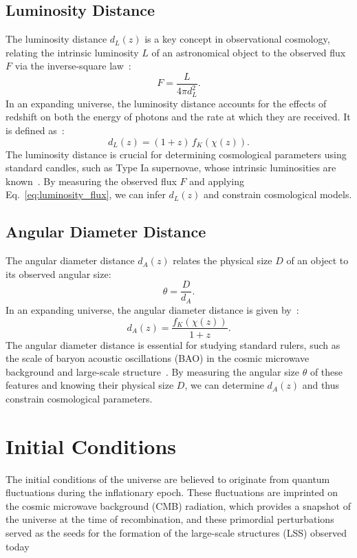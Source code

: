 \subsection{Luminosity Distance}
The luminosity distance \( d_L(z) \) is a key concept in observational cosmology, relating the intrinsic luminosity \( L \) of an astronomical object to the observed flux \( F \) via the inverse-square law~\citep{1992ARA&A..30..499C}:
\begin{equation}
    F = \frac{L}{4\pi d_L^2}.
    \label{eq:luminosity_flux}
\end{equation}
In an expanding universe, the luminosity distance accounts for the effects of redshift on both the energy of photons and the rate at which they are received. It is defined as~\citep{1999astro.ph..5116H}:
\begin{equation}
    d_L(z) = (1 + z) \, f_K(\chi(z)).
    \label{eq:luminosity_distance}
\end{equation}
The luminosity distance is crucial for determining cosmological parameters using standard candles, such as Type Ia supernovae, whose intrinsic luminosities are known~\cite{1998AJ....116.1009R}. By measuring the observed flux \( F \) and applying Eq.~\eqref{eq:luminosity_flux}, we can infer \( d_L(z) \) and constrain cosmological models.

\subsection{Angular Diameter Distance}
The angular diameter distance \( d_A(z) \) relates the physical size \( D \) of an object to its observed angular size:
\begin{equation}
    \theta = \frac{D}{d_A}.
    \label{eq:angular_diameter}
\end{equation}
In an expanding universe, the angular diameter distance is given by~\citep{1999astro.ph..5116H}:
\begin{equation}
    d_A(z) = \frac{f_K(\chi(z))}{1 + z}.
    \label{eq:angular_diameter_distance}
\end{equation}
The angular diameter distance is essential for studying standard rulers, such as the scale of baryon acoustic oscillations (BAO) in the cosmic microwave background and large-scale structure~\citep{2005ApJ...633..560E}. By measuring the angular size \( \theta \) of these features and knowing their physical size \( D \), we can determine \( d_A(z) \) and thus constrain cosmological parameters.

\section{Initial Conditions}
\label{sec:initial_conditions}
The initial conditions of the universe are believed to originate from quantum fluctuations during the inflationary epoch. These fluctuations are imprinted on the cosmic microwave background (CMB) radiation, which provides a snapshot of the universe at the time of recombination, and these primordial perturbations served as the seeds for the formation of the large-scale structures (LSS) observed today

